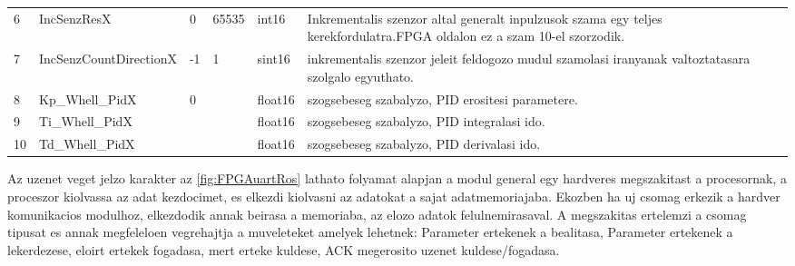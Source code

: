 \begin{table}[H]
\begin{tabular}{lllllp{6cm}}
6                   & IncSenzResX                                                                        & 0           & 65535         & int16                  &  Inkrementalis szenzor altal generalt inpulzusok szama egy teljes kerekfordulatra.FPGA oldalon ez a szam 10-el szorzodik.                     \\
7                   & IncSenzCountDirectionX                                                             & -1          & 1             & sint16                 &  inkrementalis szenzor jeleit feldogozo mudul szamolasi iranyanak valtoztatasara szolgalo egyuthato.                                          \\
8                   & Kp\_Whell\_PidX                                                                    & 0           &               & float16                &  szogsebeseg szabalyzo, PID erositesi parametere.                                                                                             \\
9                   & Ti\_Whell\_PidX                                                                    &             &               & float16                &  szogsebeseg szabalyzo, PID integralasi ido.                                                                                                  \\
10                  & Td\_Whell\_PidX                                                                    &             &               & float16                &  szogsebeseg szabalyzo, PID derivalasi ido.                                                                                                   
\end{tabular}
\end{table}


\renewcommand{\img}{SajatRobot/FPGAmodulok/UartUML.jpg}
\renewcommand{\sources}{*}
\renewcommand{\captionn}{FPGA hardver/MicroBlaze proceszor es ROS node kozti komunikacio megvalistiasa UART protokol alapjan }
\renewcommand{\figlabel}{FPGAuartRos}



Az uzenet veget jelzo karakter az \ref{fig:FPGAuartRos} lathato folyamat alapjan a modul general egy hardveres megszakitast a procesornak, a proceszor kiolvassa az adat kezdocimet, es elkezdi kiolvasni az adatokat a sajat adatmemoriajaba. Ekozben ha uj csomag erkezik a hardver komunikacios modulhoz, elkezdodik annak beirasa a memoriaba, az elozo adatok felulnemirasaval. A megszakitas ertelemzi a csomag tipusat es annak megfeleloen vegrehajtja a muveleteket amelyek lehetnek: Parameter ertekenek a bealitasa,  Parameter ertekenek a lekerdezese, eloirt ertekek fogadasa, mert erteke kuldese, ACK megerosito uzenet kuldese/fogadasa.

